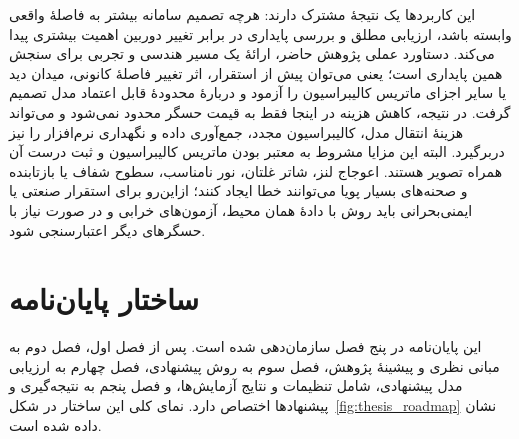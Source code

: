 این کاربردها یک نتیجهٔ مشترک دارند: هرچه تصمیم سامانه بیشتر به فاصلهٔ واقعی وابسته باشد، ارزیابی مطلق و بررسی پایداری در برابر تغییر دوربین اهمیت بیشتری پیدا می‌کند. دستاورد عملی پژوهش حاضر، ارائهٔ یک مسیر هندسی و تجربی برای سنجش همین پایداری است؛ یعنی می‌توان پیش از استقرار، اثر تغییر فاصلهٔ کانونی، میدان دید یا سایر اجزای ماتریس کالیبراسیون را آزمود و دربارهٔ محدودهٔ قابل اعتماد مدل تصمیم گرفت. در نتیجه، کاهش هزینه در اینجا فقط به قیمت حسگر محدود نمی‌شود و می‌تواند هزینهٔ انتقال مدل، کالیبراسیون مجدد، جمع‌آوری داده و نگهداری نرم‌افزار را نیز دربرگیرد. البته این مزایا مشروط به معتبر بودن ماتریس کالیبراسیون و ثبت درست آن همراه تصویر هستند. اعوجاج لنز، شاتر غلتان، نور نامناسب، سطوح شفاف یا بازتابنده و صحنه‌های بسیار پویا می‌توانند خطا ایجاد کنند؛ ازاین‌رو برای استقرار صنعتی یا ایمنی‌بحرانی باید روش با دادهٔ همان محیط، آزمون‌های خرابی و در صورت نیاز با حسگرهای دیگر اعتبارسنجی شود.

\section{ساختار پایان‌نامه}
این پایان‌نامه در پنج فصل سازمان‌دهی شده است. پس از فصل اول، فصل دوم به مبانی نظری و پیشینهٔ پژوهش، فصل سوم به روش پیشنهادی، فصل چهارم به ارزیابی مدل پیشنهادی، شامل تنظیمات و نتایج آزمایش‌ها، و فصل پنجم به نتیجه‌گیری و پیشنهادها اختصاص دارد. نمای کلی این ساختار در شکل~\ref{fig:thesis_roadmap} نشان داده شده است.

